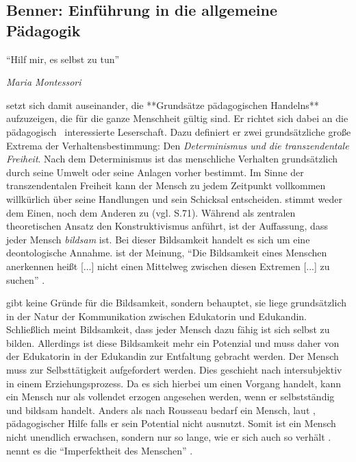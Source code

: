 \subsection{Benner: Einführung in die allgemeine Pädagogik}

\epigraph{
		``Hilf mir, es selbst zu tun''}
	{
		\emph{Maria Montessori
	}

\citeauthor{benner-2012} setzt sich damit auseinander, die **Grundsätze pädagogischen Handelns** aufzuzeigen, die für die ganze Menschheit gültig sind.
Er richtet sich dabei an die pädagogisch~ interessierte Leserschaft.
Dazu definiert er zwei grundsätzliche große Extrema der Verhaltensbestimmung: Den \emph{Determinismus und die transzendentale Freiheit}.
Nach dem Determinismus ist das menschliche Verhalten grundsätzlich durch seine Umwelt oder seine Anlagen vorher bestimmt.
Im Sinne der transzendentalen Freiheit kann der Mensch zu jedem Zeitpunkt vollkommen willkürlich über seine Handlungen und sein Schicksal entscheiden.
\citeauthor{benner-2012} stimmt weder dem Einen, noch dem Anderen zu (vgl. S.71).
Während \citeauthor{siebert-2003} als zentralen theoretischen Ansatz den Konstruktivismus anführt, ist \citeauthor{benner-2012}der Auffassung, dass jeder Mensch \emph{bildsam} ist.
Bei dieser Bildsamkeit handelt es sich um eine deontologische Annahme.
\citeauthor{benner-2012} ist der Meinung, ``Die Bildsamkeit eines Menschen anerkennen  heißt [...] nicht einen Mittelweg zwischen diesen Extremen [...] zu suchen'' \citep[72]{benner-2012}.

\citeauthor{benner-2012} gibt keine Gründe für die Bildsamkeit, sondern behauptet, sie liege grundsätzlich in der  Natur der Kommunikation zwischen Edukatorin und Edukandin.
Schließlich meint Bildsamkeit, dass jeder Mensch dazu fähig ist sich selbst zu bilden.
Allerdings ist diese Bildsamkeit mehr ein Potenzial und muss daher von der Edukatorin in der Edukandin zur Entfaltung gebracht werden.
Der Mensch muss zur Selbsttätigkeit aufgefordert werden.
Dies geschieht nach \citeauthor{benner-2012} intersubjektiv in einem Erziehungsprozess.
Da es sich hierbei um einen Vorgang handelt, kann ein Mensch nur als vollendet erzogen angesehen werden, wenn er selbstständig und bildsam handelt.
Anders als nach Rousseau bedarf ein Mensch, laut \citeauthor{benner-2012}, pädagogischer Hilfe falls er sein Potential nicht ausnutzt.
Somit ist ein Mensch nicht unendlich erwachsen, sondern nur so lange, wie er sich auch so verhält \citep[vgl.][91]{benner-2012}.
\citeauthor{benner-2012} nennt es die ``Imperfektheit des Menschen'' \citep[vgl.][78]{benner-2012}.

}
